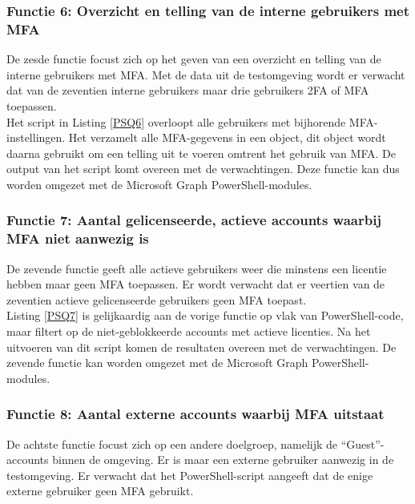 \subsubsection{Functie 6: Overzicht en telling van de interne gebruikers met MFA}


De zesde functie focust zich op het geven van een overzicht en telling van de interne gebruikers met \ac{MFA}. Met de data uit de testomgeving wordt er verwacht dat van de zeventien interne gebruikers maar drie gebruikers \ac{2FA} of \ac{MFA} toepassen. \\

Het script in Listing \ref{PSQ6} overloopt alle gebruikers met bijhorende \ac{MFA}-instellingen. Het verzamelt alle \ac{MFA}-gegevens in een object, dit object wordt daarna gebruikt om een telling uit te voeren omtrent het gebruik van \ac{MFA}. De output van het script komt overeen met de verwachtingen. Deze functie kan dus worden omgezet met de Microsoft Graph PowerShell-modules. 

\subsubsection{Functie 7: Aantal gelicenseerde, actieve accounts waarbij MFA niet aanwezig is}


De zevende functie geeft alle actieve gebruikers weer die minstens een licentie hebben maar geen \ac{MFA} toepassen. Er wordt verwacht dat er veertien van de zeventien actieve gelicenseerde gebruikers geen \ac{MFA} toepast. \\

Listing \ref{PSQ7} is gelijkaardig aan de vorige functie op vlak van PowerShell-code, maar filtert op de niet-geblokkeerde accounts met actieve licenties. Na het uitvoeren van dit script komen de resultaten overeen met de verwachtingen. De zevende functie kan worden omgezet met de Microsoft Graph PowerShell-modules.

\subsubsection{Functie 8: Aantal externe accounts waarbij MFA uitstaat}


De achtste functie focust zich op een andere doelgroep, namelijk de “Guest”-accounts binnen de omgeving. Er is maar een externe gebruiker aanwezig in de testomgeving. Er verwacht dat het PowerShell-script aangeeft dat de enige externe gebruiker geen \ac{MFA} gebruikt. \\

